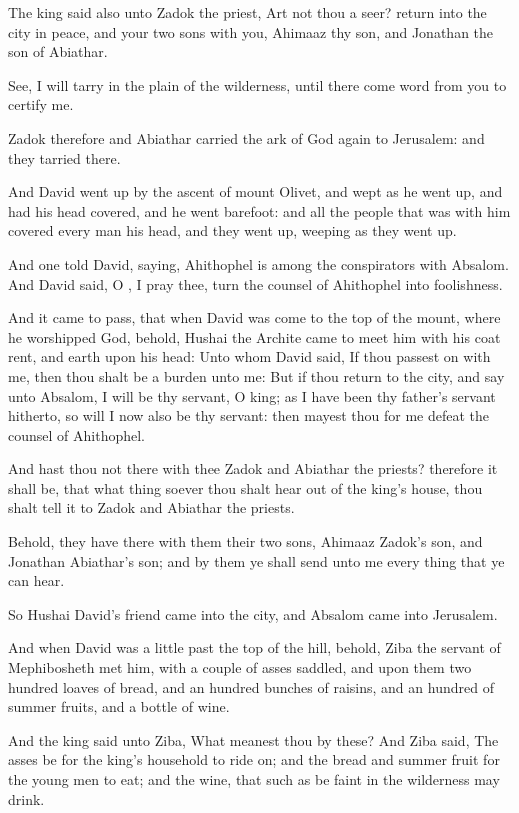 \Verse The king said also unto Zadok the priest, Art not thou a seer?  return into the city in peace, and your two sons with you, Ahimaaz thy son, and Jonathan the son of Abiathar.

\Verse See, I will tarry in the plain of the wilderness, until there come word from you to certify me.

\Verse Zadok therefore and Abiathar carried the ark of God again to Jerusalem: and they tarried there.

\Verse And David went up by the ascent of mount Olivet, and wept as he went up, and had his head covered, and he went barefoot: and all the people that was with him covered every man his head, and they went up, weeping as they went up.

\Verse And one told David, saying, Ahithophel is among the conspirators with Absalom. And David said, O \LORD, I pray thee, turn the counsel of Ahithophel into foolishness.

\Verse And it came to pass, that when David was come to the top of the mount, where he worshipped God, behold, Hushai the Archite came to meet him with his coat rent, and earth upon his head: \Verse Unto whom David said, If thou passest on with me, then thou shalt be a burden unto me: \Verse But if thou return to the city, and say unto Absalom, I will be thy servant, O king; as I have been thy father's servant hitherto, so will I now also be thy servant: then mayest thou for me defeat the counsel of Ahithophel.

\Verse And hast thou not there with thee Zadok and Abiathar the priests?  therefore it shall be, that what thing soever thou shalt hear out of the king's house, thou shalt tell it to Zadok and Abiathar the priests.

\Verse Behold, they have there with them their two sons, Ahimaaz Zadok's son, and Jonathan Abiathar's son; and by them ye shall send unto me every thing that ye can hear.

\Verse So Hushai David's friend came into the city, and Absalom came into Jerusalem.


\Chapter
\Verse And when David was a little past the top of the hill, behold, Ziba the servant of Mephibosheth met him, with a couple of asses saddled, and upon them two hundred loaves of bread, and an hundred bunches of raisins, and an hundred of summer fruits, and a bottle of wine.

\Verse And the king said unto Ziba, What meanest thou by these? And Ziba said, The asses be for the king's household to ride on; and the bread and summer fruit for the young men to eat; and the wine, that such as be faint in the wilderness may drink.

